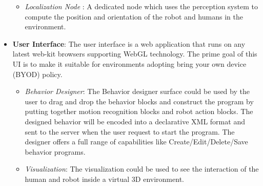 \documentclass{llncs}
\begin{document}
\begin{itemize}
\begin{itemize}
\item \emph{Localization Node} : A dedicated node which uses the perception system to compute the position and orientation of the robot and humans in the environment.
\end{itemize}
\item \textbf{User Interface}: The user interface is a web application that runs on any latest web-kit browsers supporting WebGL technology. The prime goal of this UI is to make it suitable for environments adopting bring your own device (BYOD) policy.
\begin{itemize}
\item \emph{Behavior Designer}: The Behavior designer surface could be used by the user to drag and drop the behavior blocks and construct the program by putting together motion recognition blocks and robot action blocks. The designed behavior will be encoded into a declarative XML format and sent to the server when the user request to start the program. The designer offers a full range of capabilities like Create/Edit/Delete/Save behavior programs. 
\item \emph{Visualization}: The visualization could be used to see the interaction of the human and robot inside a virtual 3D environment.
\end{itemize}
\end{itemize}
\end{document}
